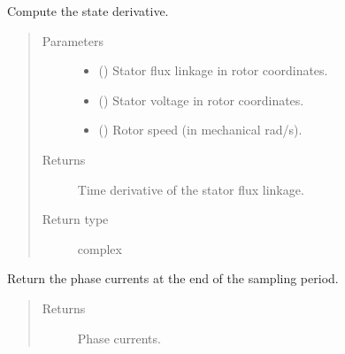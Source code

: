 \documentclass[letterpaper,10pt,english]{sphinxmanual}
\begin{document}
\begin{fulllineitems}
\begin{fulllineitems}
\label{\detokenize{model:model.sm_drive.Motor.f}}
\pysigstartsignatures
{}
\pysigstopsignatures
\sphinxAtStartPar
Compute the state derivative.
\begin{quote}\begin{description}
\item[{Parameters}] \leavevmode\begin{itemize}
\item {} 
\sphinxAtStartPar
{} () \textendash{} Stator flux linkage in rotor coordinates.

\item {} 
\sphinxAtStartPar
{} () \textendash{} Stator voltage in rotor coordinates.

\item {} 
\sphinxAtStartPar
{} () \textendash{} Rotor speed (in mechanical rad/s).

\end{itemize}

\item[{Returns}] \leavevmode
\sphinxAtStartPar
{} \textendash{} Time derivative of the stator flux linkage.

\item[{Return type}] \leavevmode
\sphinxAtStartPar
complex

\end{description}\end{quote}

\end{fulllineitems}


\begin{fulllineitems}
\label{\detokenize{model:model.sm_drive.Motor.meas_currents}}
\pysigstartsignatures
{}
\pysigstopsignatures
\sphinxAtStartPar
Return the phase currents at the end of the sampling period.
\begin{quote}\begin{description}
\item[{Returns}] \leavevmode
\sphinxAtStartPar
{} \textendash{} Phase currents.


\end{description}
\end{quote}
\end{fulllineitems}
\end{fulllineitems}
\end{document}
